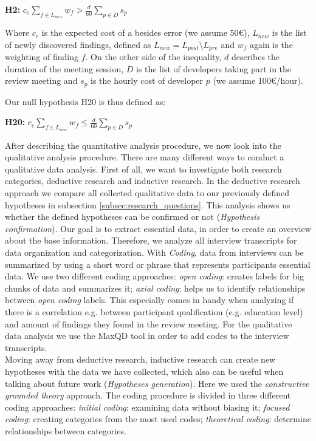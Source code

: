 \begin{center}
	\textbf{H2:} $c_e \sum_{f \in L_{new}} w_f > \frac{d}{60} \sum_{p \in D} s_p$
\end{center}

Where $c_e$ is the expected cost of a besides error (we assume 50€), $L_{new}$ is the list of newly discovered findings, defined as $L_{new} = L_{post} \setminus L_{pre}$ and $w_f$ again is the weighting of finding $f$. On the other side of the inequality, $d$ describes the duration of the meeting session, $D$ is the list of developers taking part in the review meeting and $s_p$ is the hourly cost of developer $p$ (we assume 100€/hour).

Our null hypothesis H20 is thus defined as:

\begin{center}
	\textbf{H20:} $c_e \sum_{f \in L_{new}} w_f \le \frac{d}{60} \sum_{p \in D} s_p$
\end{center} 

After describing the quantitative analysis procedure, we now look into the qualitative analysis procedure.
There are many different ways to conduct a qualitative data analysis. First of all, we want to investigate both research categories, deductive research and inductive research.
In the deductive research approach we compare all collected qualitative data to our previously defined hypotheses in subsection \ref{subsec:research_questions}. This analysis shows us whether the defined hypotheses can be confirmed or not (\textit{Hypothesis confirmation}). Our goal is to extract essential data, in order to create an overview about the base information. Therefore, we analyze all interview transcripts for data organization and categorization. With \textit{Coding}, data from interviews can be summarized by using a short word or phrase that represents participants essential data. We use two different coding approaches: \textit{open coding}: creates labels for big chunks of data and summarizes it; \textit{axial coding}: helps us to identify relationships between \textit{open coding} labels. This especially comes in handy when analyzing if there is a correlation e.g. between participant qualification (e.g. education level) and amount of findings they found in the review meeting. For the qualitative data analysis we use the MaxQD tool in order to add codes to the interview transcripts. \\
Moving away from deductive research, inductive research can create new hypotheses with the data we have collected, which also can be useful when talking about future work (\textit{Hypotheses generation}). Here we used the \textit{constructive grounded theory} approach. The coding procedure is divided in three different coding approaches: \textit{initial coding}: examining data without biasing it; \textit{focused coding}: creating categories from the most used codes; \textit{theoretical coding}: determine relationships between categories.

